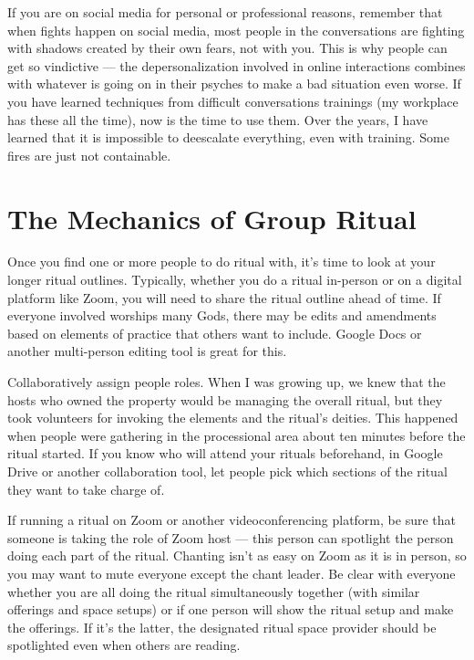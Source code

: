\documentclass[
]{book}
\begin{document}
If you are on social media for personal or professional reasons, remember that when fights happen on social media, most people in the conversations are fighting with shadows created by their own fears, not with you. This is why people can get so vindictive --- the depersonalization involved in online interactions combines with whatever is going on in their psyches to make a bad situation even worse. If you have learned techniques from difficult conversations trainings (my workplace has these all the time), now is the time to use them. Over the years, I have learned that it is impossible to deescalate everything, even with training. Some fires are just not containable.

\hypertarget{the-mechanics-of-group-ritual}{%
\section{The Mechanics of Group Ritual}\label{the-mechanics-of-group-ritual}}

Once you find one or more people to do ritual with, it's time to look at your longer ritual outlines. Typically, whether you do a ritual in-person or on a digital platform like Zoom, you will need to share the ritual outline ahead of time. If everyone involved worships many Gods, there may be edits and amendments based on elements of practice that others want to include. Google Docs or another multi-person editing tool is great for this.

Collaboratively assign people roles. When I was growing up, we knew that the hosts who owned the property would be managing the overall ritual, but they took volunteers for invoking the elements and the ritual's deities. This happened when people were gathering in the processional area about ten minutes before the ritual started. If you know who will attend your rituals beforehand, in Google Drive or another collaboration tool, let people pick which sections of the ritual they want to take charge of.

If running a ritual on Zoom or another videoconferencing platform, be sure that someone is taking the role of Zoom host --- this person can spotlight the person doing each part of the ritual. Chanting isn't as easy on Zoom as it is in person, so you may want to mute everyone except the chant leader. Be clear with everyone whether you are all doing the ritual simultaneously together (with similar offerings and space setups) or if one person will show the ritual setup and make the offerings. If it's the latter, the designated ritual space provider should be spotlighted even when others are reading.
\end{document}
